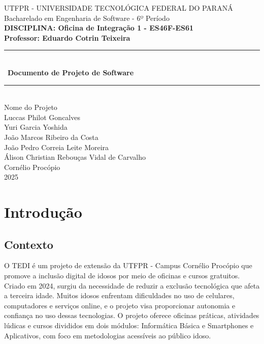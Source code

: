 \documentclass[a4paper,12pt]{article}
\begin{document}
\begin{titlepage}
    \centering
    {\Large UTFPR - UNIVERSIDADE TECNOLÓGICA FEDERAL DO PARANÁ} \\
    \vspace{0.5cm}
    {\large Bacharelado em Engenharia de Software - 6º Período} \\
    \vspace{1cm}
    {\bf DISCIPLINA: Oficina de Integração 1 - ES46F-ES61} \\
    \vspace{0.5cm}
    {\bf Professor: Eduardo Cotrin Teixeira} \\
    \vfill
    \rule{\linewidth}{1.5pt} \\
        \vspace{0.5cm} \
    {\Huge \textbf{Documento de Projeto de Software}} \\
    \rule{\linewidth}{1.5pt} \\
    \vspace{1cm}
    {\Large Nome do Projeto} \\
    \vfill
    {\large Luccas Philot Goncalves\\
            Yuri Garcia Yoshida\\
            João Marcos Ribeiro da Costa\\
            João Pedro Correia Leite Moreira\\
            Álison Christian Rebouças Vidal de Carvalho\\
            
    }
    \vspace{1cm}
    {\large Cornélio Procópio} \\
    {\large 2025} \\
\end{titlepage}


\tableofcontents
\newpage


\section{Introdução}
\subsection{Contexto}
O TEDI é um projeto de extensão da UTFPR - Campus Cornélio Procópio que promove a inclusão digital de idosos por meio de oficinas e cursos gratuitos. Criado em 2024, surgiu da necessidade de reduzir a exclusão tecnológica que afeta a terceira idade. Muitos idosos enfrentam dificuldades no uso de celulares, computadores e serviços online, e o projeto visa proporcionar autonomia e confiança no uso dessas tecnologias. O projeto oferece oficinas práticas, atividades lúdicas e cursos divididos em dois módulos: Informática Básica e Smartphones e Aplicativos, com foco em metodologias acessíveis ao público idoso.
\end{document}
